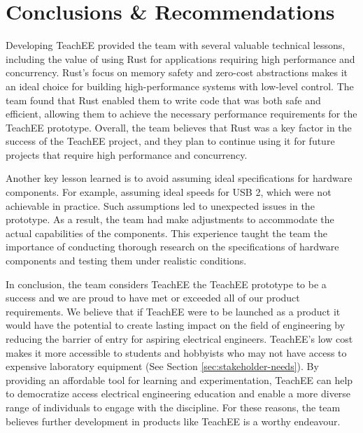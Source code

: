\documentclass[letterpaper,11pt]{article}
\begin{document}
\section{Conclusions \& Recommendations} %

Developing TeachEE provided the team with several valuable technical lessons,
including the value of using Rust for applications requiring high performance
and concurrency. Rust's focus on memory safety and zero-cost abstractions makes
it an ideal choice for building high-performance systems with low-level
control. The team found that Rust enabled them to write code that was both safe
and efficient, allowing them to achieve the necessary performance requirements
for the TeachEE prototype. Overall, the team believes that Rust was a key
factor in the success of the TeachEE project, and they plan to continue using
it for future projects that require high performance and concurrency.

Another key lesson learned is to avoid assuming ideal specifications for hardware
components. For example, assuming ideal speeds for USB 2, which were not
achievable in practice. Such assumptions led to unexpected issues in the
prototype. As a result, the team had make adjustments to accommodate the actual
capabilities of the components. This experience taught the team the importance
of conducting thorough research on the specifications of hardware components
and testing them under realistic conditions.

In conclusion, the team considers TeachEE the TeachEE prototype to be a success
and we are proud to have met or exceeded all of our product requirements. We
believe that if TeachEE were to be launched as a product it would have the
potential to create lasting impact on the field of engineering by reducing the
barrier of entry for aspiring electrical engineers. TeachEE's low cost makes it
more accessible to students and hobbyists who may not have access to expensive
laboratory equipment (See Section \ref{sec:stakeholder-needs}). By providing an
affordable tool for learning and experimentation, TeachEE can help to
democratize access electrical engineering education and enable a more diverse
range of individuals to engage with the discipline. For these reasons, the team
believes further development in products like TeachEE is a worthy endeavour.
\end{document}
